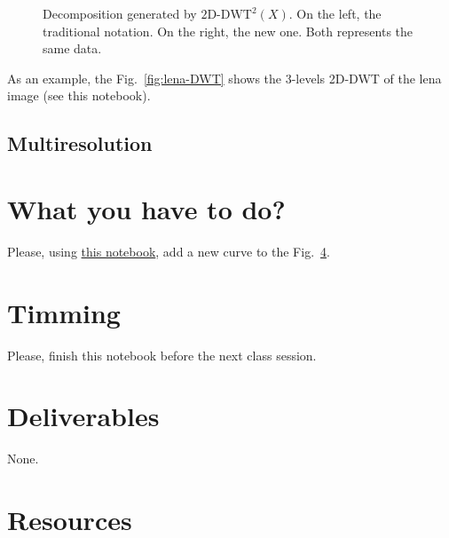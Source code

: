 \begin{figure}
  \centering
  \caption{Decomposition generated by $\text{2D-DWT}^2(X)$. On the
    left, the traditional notation. On the right, the new one. Both
    represents the same data.}
  \label{fig:2D-DWT}
\end{figure}

As an example, the Fig.~\ref{fig:lena-DWT} shows the $3$-levels
2D-DWT of the lena image (see this notebook).

\subsection{Multiresolution}

\section{What you have to do?}
  
Please, using \href{}{this notebook}, add a new curve to the Fig.~\ref{}.

\section{Timming}

Please, finish this notebook before the next class session.

\section{Deliverables}

None.

\section{Resources}


